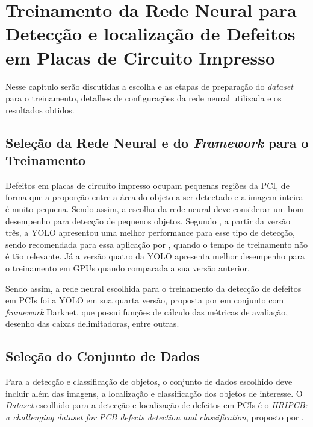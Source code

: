 \chapter{Treinamento da Rede Neural para Detecção e localização de Defeitos em Placas de Circuito Impresso} \label{cap:treinamento}
Nesse capítulo serão discutidas a escolha e as etapas de preparação do \textit{dataset} para o treinamento, detalhes de configurações da rede neural utilizada e os resultados obtidos.

\section{Seleção da Rede Neural e do \textit{Framework} para o Treinamento} \label{cap:treinamento-rn}

Defeitos em placas de circuito impresso ocupam pequenas regiões da PCI, de forma que a proporção entre a área do objeto a ser detectado e a imagem inteira é muito pequena. Sendo assim, a escolha da rede neural deve considerar um bom desempenho para detecção de pequenos objetos. Segundo , a partir da versão três, a YOLO apresentou uma melhor performance para esse tipo de detecção, sendo recomendada para essa aplicação por , quando o tempo de treinamento não é tão relevante. Já a versão quatro da YOLO apresenta melhor desempenho para o treinamento em GPUs quando comparada a sua versão anterior.

Sendo assim, a rede neural escolhida para o treinamento da detecção de defeitos em PCIs foi a YOLO em sua quarta versão, proposta por  em conjunto com \textit{framework} Darknet, que possui funções de cálculo das métricas de avaliação, desenho das caixas delimitadoras, entre outras.

\section{Seleção do Conjunto de Dados} \label{cap:treinamento-dataset}

Para a detecção e classificação de objetos, o conjunto de dados escolhido deve incluir além das imagens, a localização e classificação dos objetos de interesse.
O \textit{Dataset} escolhido para a detecção e localização de defeitos em PCIs é o \textit{HRIPCB: a challenging dataset for PCB defects detection and classification}, proposto por .

